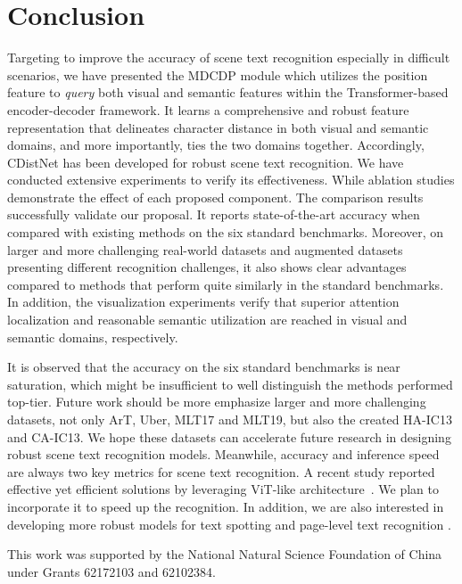 \section{Conclusion}
Targeting to improve the accuracy of scene text recognition especially in difficult scenarios, we have presented the MDCDP module which utilizes the position feature to \emph{query} both visual and semantic features within the Transformer-based encoder-decoder framework. It learns a comprehensive and robust feature representation that delineates character distance in both visual and semantic domains, and more importantly, ties the two domains together. Accordingly, CDistNet has been developed for robust scene text recognition. We have conducted extensive experiments to verify its effectiveness. While ablation studies demonstrate the effect of each proposed component. The comparison results successfully validate our proposal. It reports state-of-the-art accuracy when compared with existing methods on the six standard benchmarks. Moreover, on larger and more challenging real-world datasets and augmented datasets presenting different recognition challenges, it also shows clear advantages compared to methods that perform quite similarly in the standard benchmarks. In addition, the visualization experiments verify that superior attention localization and reasonable semantic utilization are reached in visual and semantic domains, respectively. 

It is observed that the accuracy on the six standard benchmarks is near saturation, which might be insufficient to well distinguish the methods performed top-tier. Future work should be more emphasize larger and more challenging datasets, not only ArT, Uber, MLT17 and MLT19, but also the created HA-IC13 and CA-IC13. We hope these datasets can accelerate future research in designing robust scene text recognition models. Meanwhile, accuracy and inference speed are always two key metrics for scene text recognition. A recent study reported effective yet efficient solutions by leveraging ViT-like architecture~\citep{Du2022SVTR}. We plan to incorporate it to speed up the recognition. In addition, we are also interested in developing more robust models for text spotting \citep{fang2022abinet++} and page-level text recognition \citep{peng2022pagenet}.


\begin{acknowledgements}
This work was supported by the National Natural Science Foundation of China under Grants 62172103 and 62102384.
\end{acknowledgements}

         


